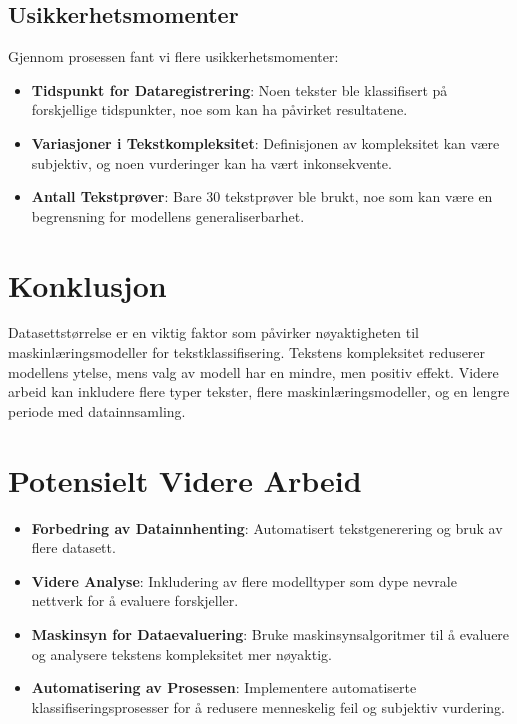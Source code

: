 \documentclass{article}
\begin{document}
\subsection{Usikkerhetsmomenter}
Gjennom prosessen fant vi flere usikkerhetsmomenter:
\begin{itemize}
    \item \textbf{Tidspunkt for Dataregistrering}: Noen tekster ble klassifisert på forskjellige tidspunkter, noe som kan ha påvirket resultatene.
    \item \textbf{Variasjoner i Tekstkompleksitet}: Definisjonen av kompleksitet kan være subjektiv, og noen vurderinger kan ha vært inkonsekvente.
    \item \textbf{Antall Tekstprøver}: Bare 30 tekstprøver ble brukt, noe som kan være en begrensning for modellens generaliserbarhet.
\end{itemize}

\section{Konklusjon}
Datasettstørrelse er en viktig faktor som påvirker nøyaktigheten til maskinlæringsmodeller for tekstklassifisering. Tekstens kompleksitet reduserer modellens ytelse, mens valg av modell har en mindre, men positiv effekt. Videre arbeid kan inkludere flere typer tekster, flere maskinlæringsmodeller, og en lengre periode med datainnsamling.

\section{Potensielt Videre Arbeid}
\begin{itemize}
    \item \textbf{Forbedring av Datainnhenting}: Automatisert tekstgenerering og bruk av flere datasett.
    \item \textbf{Videre Analyse}: Inkludering av flere modelltyper som dype nevrale nettverk for å evaluere forskjeller.
    \item \textbf{Maskinsyn for Dataevaluering}: Bruke maskinsynsalgoritmer til å evaluere og analysere tekstens kompleksitet mer nøyaktig.
    \item \textbf{Automatisering av Prosessen}: Implementere automatiserte klassifiseringsprosesser for å redusere menneskelig feil og subjektiv vurdering.
\end{itemize}
\citep{nyberg2017statistikk}
\citep{bakken2009multippel}
\citep{nyberg2023statistical}
\citep{openai2023chatgpt}

\end{document}
